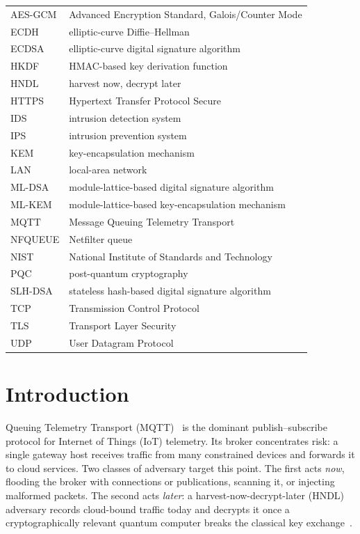 \documentclass[journal]{IEEEtran}
\begin{document}
{\footnotesize
\begin{tabular}{@{}p{2.15cm}p{5.55cm}@{}}
AES-GCM  & Advanced Encryption Standard, Galois/Counter Mode \\
ECDH     & elliptic-curve Diffie--Hellman \\
ECDSA    & elliptic-curve digital signature algorithm \\
HKDF     & HMAC-based key derivation function \\
HNDL     & harvest now, decrypt later \\
HTTPS    & Hypertext Transfer Protocol Secure \\
IDS      & intrusion detection system \\
IPS      & intrusion prevention system \\
KEM      & key-encapsulation mechanism \\
LAN      & local-area network \\
ML-DSA   & module-lattice-based digital signature algorithm \\
ML-KEM   & module-lattice-based key-encapsulation mechanism \\
MQTT     & Message Queuing Telemetry Transport \\
NFQUEUE  & Netfilter queue \\
NIST     & National Institute of Standards and Technology \\
PQC      & post-quantum cryptography \\
SLH-DSA  & stateless hash-based digital signature algorithm \\
TCP      & Transmission Control Protocol \\
TLS      & Transport Layer Security \\
UDP      & User Datagram Protocol \\
\end{tabular}
}

\section{Introduction}
\label{sec:intro}

 Queuing Telemetry Transport (MQTT)~\cite{mqtt_oasis} is the dominant publish--subscribe protocol for Internet of Things (IoT) telemetry. Its broker concentrates risk: a single gateway host receives traffic from many constrained devices and forwards it to cloud services. Two classes of adversary target this point. The first acts \emph{now}, flooding the broker with connections or publications, scanning it, or injecting malformed packets. The second acts \emph{later}: a harvest-now-decrypt-later (HNDL) adversary records cloud-bound traffic today and decrypts it once a cryptographically relevant quantum computer breaks the classical key exchange~\cite{shor1994,mosca2018}.
\end{document}
